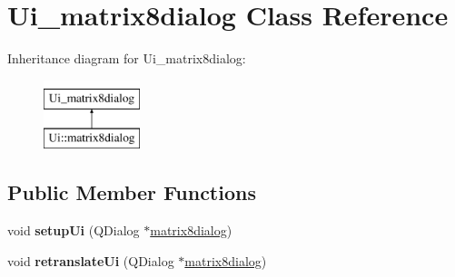 \hypertarget{class_ui__matrix8dialog}{}\section{Ui\+\_\+matrix8dialog Class Reference}
\label{class_ui__matrix8dialog}
Inheritance diagram for Ui\+\_\+matrix8dialog\+:\begin{figure}[H]
\begin{center}
\leavevmode
\includegraphics[height=2.000000cm]{class_ui__matrix8dialog}
\end{center}
\end{figure}
\subsection*{Public Member Functions}
\begin{DoxyCompactItemize}
\item 
\mbox{\label{class_ui__matrix8dialog_a2b39e0a8327011911b0cd985a4d5697f}} 
void {\bfseries setup\+Ui} (Q\+Dialog $\ast$\mbox{\hyperlink{classmatrix8dialog}{matrix8dialog}})
\item 
\mbox{\label{class_ui__matrix8dialog_a1e76584117237b2839700411c6b1d748}} 
void {\bfseries retranslate\+Ui} (Q\+Dialog $\ast$\mbox{\hyperlink{classmatrix8dialog}{matrix8dialog}})
\end{DoxyCompactItemize}
